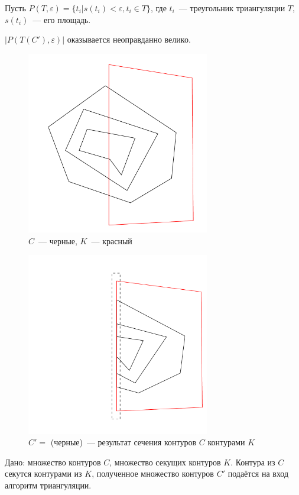 \documentclass[a4paper,12pt,titlepage]{report}
\begin{document}
Пусть $P(T, \varepsilon) = \{ t_i | s(t_i) <  \varepsilon, t_i \in T \}$, где $t_i$~--- треугольник триангуляции $T$, 
$s(t_i)$~--- его площадь.

$|P(T(C'), \varepsilon)|$ оказывается неоправданно велико.

\begin{figure}[htp]
\centering
\includegraphics[width=8cm, height=8cm]{orig_contours.pdf}
\caption{$C$~--- черные, $K$~--- красный}\label{fig:orig_contours}
\end{figure}

\begin{figure}[htp]
\centering
\includegraphics[width=8cm, height=8cm]{cutted_contours.pdf}
\caption{$C' = $ (черные)~--- результат сечения контуров $C$ контурами $K$}\label{fig:cutted_contours}
\end{figure}

Дано: множество контуров $C$, множество секущих контуров $K$.
Контура из $C$ секутся контурами из $K$, полученное множество контуров $C'$ 
подаётся на вход алгоритм триангуляции.
\end{document}
